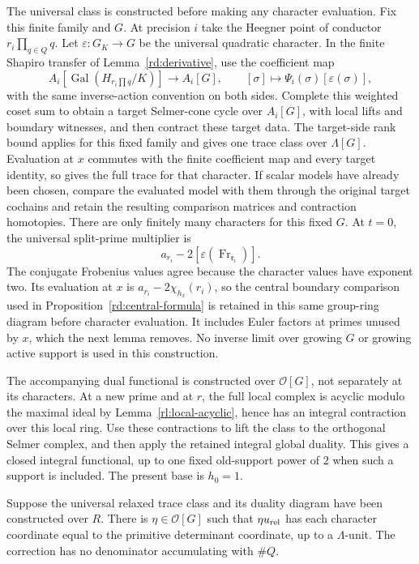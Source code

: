 The universal class is constructed before making any character
evaluation.  Fix this finite family and \(G\).  At precision \(i\)
take the Heegner point of conductor \(r_i\prod_{q\in Q}q\).
Let \(\varepsilon:G_K\to G\) be the universal quadratic character.
In the finite Shapiro transfer of Lemma~\ref{rd:derivative}, use
the coefficient map
\[
 A_i[\operatorname{Gal}(H_{r_i\prod q}/K)]
       \longrightarrow A_i[G],\qquad
 [\sigma]\longmapsto\Psi_i(\sigma)[\varepsilon(\sigma)],
\]
with the same inverse-action convention on both sides.  Complete
this weighted coset sum to obtain a target Selmer-cone cycle over
\(A_i[G]\), with local lifts and boundary witnesses, and then
contract these target data.  The target-side rank bound applies
for this fixed family and gives one trace class over \(\Lambda[G]\).
Evaluation at \(x\) commutes with the finite coefficient map and
every target identity, so gives the full trace for that character.
If scalar models have already been chosen, compare the evaluated
model with them through the original target cochains and retain the
resulting comparison matrices and contraction homotopies.  There are
only finitely many characters for this fixed \(G\).  At \(t=0\), the
universal split-prime multiplier is
\[
 a_{r_i}-2[\varepsilon(\operatorname{Fr}_{\mathfrak r_i})].
\]
The conjugate Frobenius values agree because the character values
have exponent two.  Its evaluation at \(x\) is
\(a_{r_i}-2\chi_{h_x}(r_i)\), so the central boundary comparison
used in Proposition~\ref{rd:central-formula} is retained in this
same group-ring diagram before character evaluation.
It includes Euler factors at primes unused by \(x\), which the next
lemma removes.  No inverse limit over growing \(G\) or growing active
support is used in this construction.

The accompanying dual functional is constructed over
\(\mathcal O[G]\), not separately at its characters.  At a new
prime and at \(r\), the full local complex is acyclic modulo
the maximal ideal by Lemma~\ref{rl:local-acyclic}, hence has an
integral contraction over this local ring.  Use these contractions
to lift the class to the orthogonal Selmer complex, and then apply
the retained integral global duality.  This gives a closed integral
functional, up to one fixed old-support power of \(2\) when such
a support is included.  The present base is \(h_0=1\).

\begin{lemma}
\label{rd:unused}
Suppose the universal relaxed trace class and its duality
diagram have been constructed over \(R\).
There is \(\eta\in\mathcal O[G]\) such that
\(\eta u_{\rm rel}\) has each character coordinate
equal to the primitive determinant coordinate, up
to a \(\Lambda\)-unit.  The correction has no
denominator accumulating with \(\#Q\).
\end{lemma}

